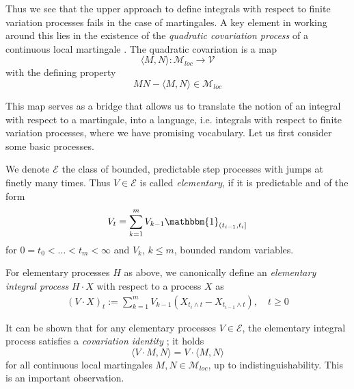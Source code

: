 		Thus we see that the upper approach to define integrals with respect to finite variation processes fails in the case of martingales. A key element in working around this lies in the existence of the \emph{quadratic covariation process} of a continuous local martingale \cite[thm. 18.5]{Kallenberg}. The quadratic covariation is a map
	\begin{equation*}
		\langle M, N \rangle : \mathcal{M}_{loc} \rightarrow \mathcal{V}
	\end{equation*}
with the defining property 
\begin{equation*}
	M N  - \langle M, N \rangle \in \mathcal{M}_{loc}
\end{equation*}

This map serves as a bridge that allows us to translate the notion of an integral with respect to a martingale, into a language, i.e. integrals with respect to finite variation processes, where we have promising vocabulary. Let us first consider some basic processes.

\begin{definition} We denote $\mathcal{E}$ the class of bounded, predictable step processes with jumps at finetly many times. Thus $V \in \mathcal{E}$ is called \emph{elementary}, if it is predictable and of the form
	\begin{equation*}
		V_t = \sum_{k=1}^m V_{k-1} \mathbbm{1}_{(t_{i-1}, t_i]}
	\end{equation*}
	for $0 = t_0 < \dots < t_m < \infty$ and $V_k$, $k \leq m$, bounded random variables.
\end{definition} 
For elementary processes $H$ as above, we canonically define an \emph{elementary integral process} $H \cdot X$ with respect to a process $X$ as
\begin{align}\label{elementaryintegral}
	(V \cdot X)_t := \sum_{k=1}^m V_{k-1} (X_{t_{i} \wedge t} - X_{t_{i-1} \wedge t}), \quad t \geq 0
\end{align}

It can be shown that for any elementary processes $V \in \mathcal{E}$, the elementary integral process satisfies a \emph{covariation identity} \cite[lemma 18.10]{Kallenberg}; it holds
\begin{equation}\label{covariationidentity}
	\langle V \cdot M, N \rangle = V \cdot \langle M, N \rangle
\end{equation}
for all continuous local martingales $M, N \in \mathcal{M}_{loc}$, up to indistinguishability. This is an important observation. 

